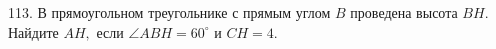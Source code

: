 113. В прямоугольном треугольнике с прямым углом $B$ проведена высота $BH.$ Найдите $AH,$ если $\angle ABH=60^\circ$ и $CH=4.$\\
